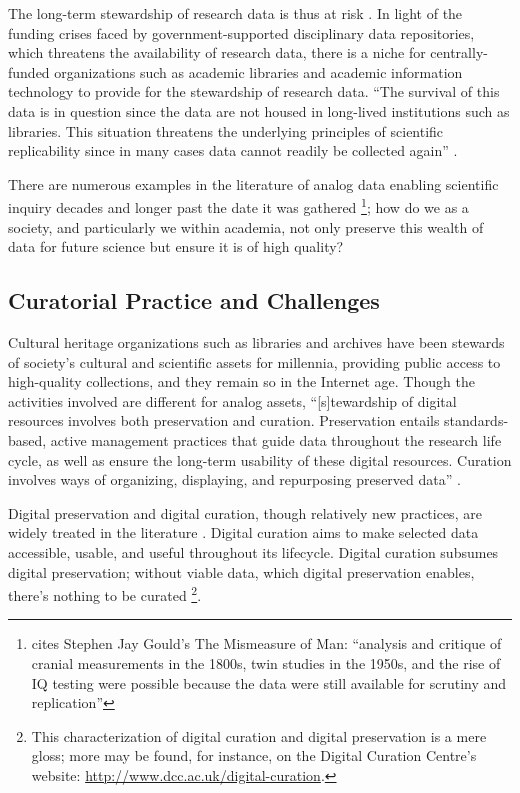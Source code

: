 \documentclass[12pt,letterpaper,titlepage,onecolumn,biblatex,backend=biber,style=chicago-authordate]{article}
\begin{document}
The long-term stewardship of research data is thus at
risk \autocite{ogburn:imperative}.  In light of the funding crises
faced by government-supported disciplinary data repositories, which
threatens the availability of research data, there is a niche for
centrally-funded organizations such as academic libraries and academic
information technology to provide for the stewardship of research
data. ``The survival of this data is in question since the data are
not housed in long-lived institutions such as libraries. This
situation threatens the underlying principles of scientific
replicability since in many cases data cannot readily be collected
again''
\autocite{heidorn:libraries}.

There are numerous examples in the literature of analog data enabling
scientific inquiry decades and longer past the date it was gathered
\footnote{\textcite{ogburn:imperative} cites Stephen Jay Gould's The
  Mismeasure of Man: ``analysis and critique of cranial measurements
  in the 1800s, twin studies in the 1950s, and the rise of IQ testing
  were possible because the data were still available for scrutiny and
  replication''}; how do we as a society, and particularly we within
academia, not only preserve this wealth of data for future science but
ensure it is of high quality?

\subsection{Curatorial Practice and Challenges}

Cultural heritage organizations such as libraries and archives have
been stewards of society's cultural and scientific assets for
millennia, providing public access to high-quality collections, and
they remain so in the Internet age. Though the activities involved are
different for analog assets, ``[s]tewardship of digital resources
involves both preservation and curation. Preservation entails
standards-based, active management practices that guide data
throughout the research life cycle, as well as ensure the long-term
usability of these digital resources. Curation involves ways of
organizing, displaying, and repurposing preserved data''
\autocite{arl:stewardship}.

Digital preservation and digital curation, though relatively new
practices, are widely treated in the literature
\autocite{jisc:deluge,curry:community,goble:curation,ogburn:imperative,heidorn:libraries,williams:lifecycle,arl:stewardship}. Digital
curation aims to make selected data accessible, usable, and useful
throughout its lifecycle. Digital curation subsumes digital
preservation; without viable data, which digital preservation enables,
there's nothing to be curated \footnote{This characterization of
  digital curation and digital preservation is a mere gloss; more may
  be found, for instance, on the Digital Curation Centre's website:
  \url{http://www.dcc.ac.uk/digital-curation}.}.
\end{document}
